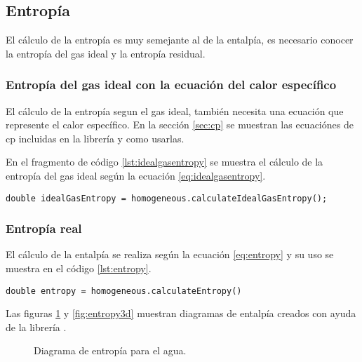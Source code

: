 \subsection{Entropía}

	El cálculo de la entropía es muy semejante al de la entalpía, es necesario conocer la entropía del gas ideal y la entropía residual.

\subsubsection{Entropía del gas ideal con la ecuación del calor específico}

	El cálculo de la entropía segun el gas ideal, también necesita una ecuación que represente el calor específico. En la sección \ref{sec:cp} se muestran las ecuaciónes de cp incluidas en la librería y como usarlas.

	En el fragmento de código \ref{lst:idealgasentropy} se muestra el cálculo de la entropía del gas ideal según la ecuación \ref{eq:idealgasentropy}. 

	\begin{lstlisting}[label={lst:idealgasentropy},caption={Cálculo de la entropía absoluta del gas ideal.}]
	double idealGasEntropy = homogeneous.calculateIdealGasEntropy();
	\end{lstlisting}

\subsubsection{Entropía real}

	El cálculo de la entalpía se realiza según la ecuación \ref{eq:entropy} y su uso se muestra en el código \ref{lst:entropy}.

\begin{lstlisting}[label={lst:entropy},caption={Cálculo de la entropía absoluta.}]
	double entropy = homogeneous.calculateEntropy()
\end{lstlisting}

	Las figuras \ref{fig:2dentropy} y \ref{fig:entropy3d} muestran diagramas de entalpía creados con ayuda de la librería \Materia.


\begin{figure}[!h]
	\centering	
	\caption{Diagrama de entropía para el agua.}\label{fig:2dentropy}
\end{figure}

